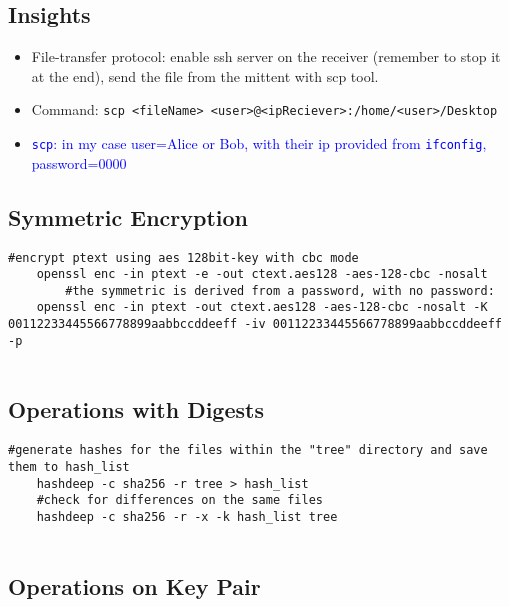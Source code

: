 \subsection*{Insights}
\begin{itemize}
	\item File-transfer protocol: enable ssh server on the receiver (remember to stop it at the end), send the file from the mittent with scp tool.
	\item Command: \texttt{scp <fileName> <user>@<ipReciever>:/home/<user>/Desktop}
	\item \textcolor{Blue}{\texttt{scp}: in my case user=Alice or Bob, with their ip provided from \texttt{ifconfig}, password=0000}
\end{itemize}

\subsection*{Symmetric Encryption}
\begin{lstlisting}[style=bashStyle]
	#encrypt ptext using aes 128bit-key with cbc mode
	openssl enc -in ptext -e -out ctext.aes128 -aes-128-cbc -nosalt
		#the symmetric is derived from a password, with no password:
	openssl enc -in ptext -out ctext.aes128 -aes-128-cbc -nosalt -K 00112233445566778899aabbccddeeff -iv 00112233445566778899aabbccddeeff -p
	
\end{lstlisting}

\subsection*{Operations with Digests}

\begin{lstlisting}[style=bashStyle]
	#generate hashes for the files within the "tree" directory and save them to hash_list
	hashdeep -c sha256 -r tree > hash_list
	#check for differences on the same files
	hashdeep -c sha256 -r -x -k hash_list tree
	
\end{lstlisting}


\clearpage

\subsection*{Operations on Key Pair}

